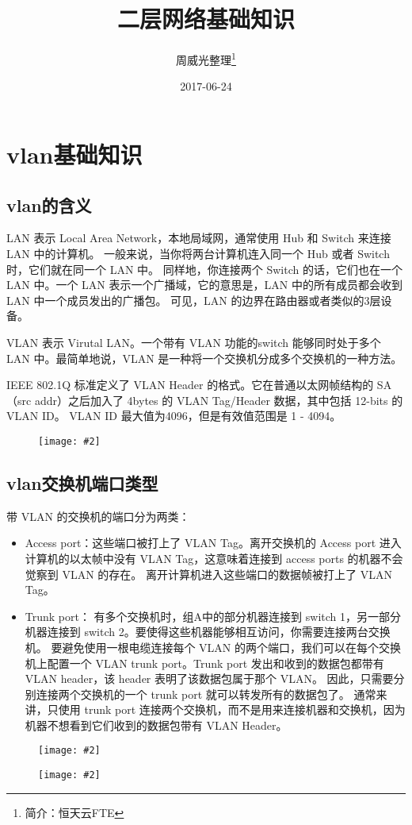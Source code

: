 \documentclass[a4paper,left=1.5cm,right=1.5cm,11pt]{article}
\title{二层网络基础知识}
\author{周威光整理\footnote{简介：恒天云FTE}}
\date{2017-06-24}
\newcommand{\sizedfic}[2]{\begin{figure}[H]
		\center
		\texttt{[image: \#2]}
	\end{figure}}
\begin{document}
\maketitle
\clearpage
\tableofcontents
\clearpage
\section{vlan基础知识}
\subsection{vlan的含义}
LAN 表示 Local Area Network，本地局域网，通常使用 Hub 和 Switch 来连接LAN 中的计算机。
一般来说，当你将两台计算机连入同一个 Hub 或者 Switch 时，它们就在同一个 LAN 中。
同样地，你连接两个 Switch 的话，它们也在一个 LAN 中。一个 LAN 表示一个广播域，它的意思是，LAN 中的所有成员都会收到 LAN 中一个成员发出的广播包。
可见，LAN 的边界在路由器或者类似的3层设备。\par
VLAN 表示 Virutal LAN。一个带有 VLAN 功能的switch 能够同时处于多个 LAN 中。最简单地说，VLAN 是一种将一个交换机分成多个交换机的一种方法。\par
IEEE 802.1Q 标准定义了 VLAN Header 的格式。它在普通以太网帧结构的 SA （src addr）之后加入了 4bytes 的 VLAN Tag/Header 数据，其中包括 12-bits 的 VLAN ID。
VLAN ID 最大值为4096，但是有效值范围是 1 - 4094。
\sizedfic{0.6}{vlan.png}
\subsection{vlan交换机端口类型}
带 VLAN 的交换机的端口分为两类：
\begin{itemize}
	\item[(1).]Access port：这些端口被打上了 VLAN Tag。离开交换机的 Access port 进入计算机的以太帧中没有 VLAN Tag，这意味着连接到 access ports 的机器不会觉察到 VLAN 的存在。
	离开计算机进入这些端口的数据帧被打上了 VLAN Tag。
	\item[(2).]Trunk port： 有多个交换机时，组A中的部分机器连接到 switch 1，另一部分机器连接到 switch 2。要使得这些机器能够相互访问，你需要连接两台交换机。 
	要避免使用一根电缆连接每个 VLAN 的两个端口，我们可以在每个交换机上配置一个 VLAN trunk port。Trunk port 发出和收到的数据包都带有 VLAN header，该 header 表明了该数据包属于那个 VLAN。
	因此，只需要分别连接两个交换机的一个 trunk port 就可以转发所有的数据包了。
	通常来讲，只使用 trunk port 连接两个交换机，而不是用来连接机器和交换机，因为机器不想看到它们收到的数据包带有 VLAN Header。
\end{itemize}
\sizedfic{0.8}{vlan_port.jpg}
\sizedfic{0.3}{vlan_port2.jpg}
\end{document}
